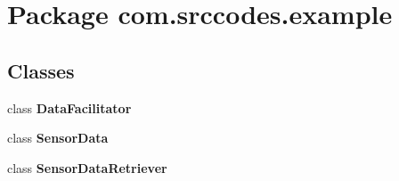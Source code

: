 \section{Package com.\-srccodes.\-example}
\label{namespacecom_1_1srccodes_1_1example}
\subsection*{Classes}
\begin{DoxyCompactItemize}
\item 
class {\bf Data\-Facilitator}
\item 
class {\bf Sensor\-Data}
\item 
class {\bf Sensor\-Data\-Retriever}
\end{DoxyCompactItemize}
